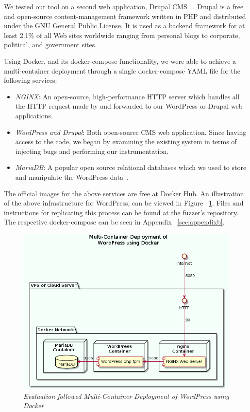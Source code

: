 We tested our tool on a second web application, Drupal CMS ~\cite{drupal}. Drupal is a free and open-source content-management framework written in PHP and distributed under the GNU General Public License. It is used as a backend framework for at least 2.1\% of all Web sites worldwide ranging from personal blogs to corporate, political, and government sites.

Using Docker, and its docker-compose functionality, we were able to achieve a multi-container deployment through a single docker-compose YAML file for the following services:

\begin{itemize}
	\item \emph{NGINX}: An open-source, high-performance HTTP server which handles all the HTTP request made by \pname{} and forwarded to our WordPress or Drupal web applications.{~\cite{nginx}}
	\item \emph{WordPress and Drupal}: Both open-source CMS web application. Since having access to the code, we began by examining the existing system in terms of injecting bugs and performing our instrumentation.
	\item \emph{MariaDB}: A popular open source relational databases which we used to store and manipulate the WordPress data~\cite{mariadb}.
\end{itemize}

The official images for the above services are free at Docker Hub. An illustration of the above infrastructure for WordPress, can be viewed in Figure ~\ref{fig:multi-container}. Files and instructions for replicating this process can be found at the fuzzer's repository. The respective docker-compose can be seen in Appendix ~\ref{sec:appendixb}.

\begin{figure}[ht]
 \centering
 \captionsetup{justification=centering}
 \includegraphics[width=\linewidth]{figures/multi-container.png}
 \caption[Multi-Container Deployment of WordPress using Docker]{\textit{Evaluation followed Multi-Container Deployment of WordPress using Docker}}
 \label{fig:multi-container}
\end{figure}

